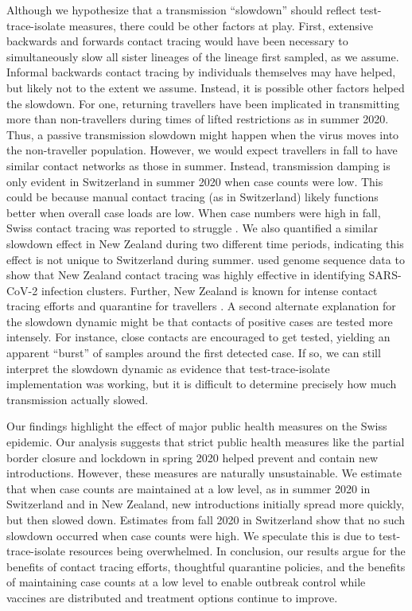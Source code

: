 \documentclass[11pt,twoside,lineno]{pnas-new} %
\begin{document}
Although we hypothesize that a transmission ``slowdown'' should reflect test-trace-isolate measures, there could be other factors at play. First, extensive backwards and forwards contact tracing would have been necessary to simultaneously slow all sister lineages of the lineage first sampled, as we assume. Informal backwards contact tracing by individuals themselves may have helped, but likely not to the extent we assume. Instead, it is possible other factors helped the slowdown. For one, returning travellers have been implicated in transmitting more than non-travellers \cite{Hodcroft2021} during times of lifted restrictions as in summer 2020. Thus, a passive transmission slowdown might happen when the virus moves into the non-traveller population. However, we would expect travellers in fall to have similar contact networks as those in summer. Instead, transmission damping is only evident in Switzerland in summer 2020 when case counts were low. This could be because manual contact tracing (as in Switzerland) likely functions better when overall case loads are low. When case numbers were high in fall, Swiss contact tracing was reported to struggle \cite{SWI-contact-tracing-failing}. We also quantified a similar slowdown effect in New Zealand during two different time periods, indicating this effect is not unique to Switzerland during summer. \cite{Mendes2021} used genome sequence data to show that New Zealand contact tracing was highly effective in identifying SARS-CoV-2 infection clusters. Further, New Zealand is known for intense contact tracing efforts and quarantine for travellers \cite{ZL-covid-policies}. A second alternate explanation for the slowdown dynamic might be that contacts of positive cases are tested more intensely. For instance, close contacts are encouraged to get tested, yielding an apparent ``burst'' of samples around the first detected case. If so, we can still interpret the slowdown dynamic as evidence that test-trace-isolate implementation was working, but it is difficult to determine precisely how much transmission actually slowed.

Our findings highlight the effect of major public health measures on the Swiss epidemic. Our analysis suggests that strict public health measures like the partial border closure and lockdown in spring 2020 helped prevent and contain new introductions. However, these measures are naturally unsustainable. We estimate that when case counts are maintained at a low level, as in summer 2020 in Switzerland and in New Zealand, new introductions initially spread more quickly, but then slowed down. Estimates from fall 2020 in Switzerland show that no such slowdown occurred when case counts were high. We speculate this is due to test-trace-isolate resources being overwhelmed. In conclusion, our results argue for the benefits of contact tracing efforts, thoughtful quarantine policies, and the benefits of maintaining case counts at a low level to enable outbreak control while vaccines are distributed and treatment options continue to improve.
\end{document}
